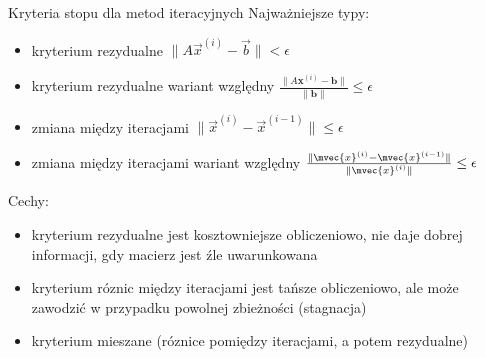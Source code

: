 \begin{frame}{Kryteria stopu dla metod iteracyjnych}
Najważniejsze typy:
\begin{itemize}
    \item kryterium rezydualne $\|A \vec{x}^{(i)} - \vec{b}\| < \epsilon$ 
    \item kryterium rezydualne wariant względny $\frac{\|A\mathbf{x}^{(i)} - \mathbf{b}\|}{\|\mathbf{b}\|} \leq \epsilon$  
    \item zmiana między iteracjami $\|\vec{x}^{(i)} - \vec{x}^{(i-1)}\|\leq \epsilon$  
    \item zmiana między iteracjami wariant względny 
    $\frac{\|\mvec{x}^{(i)} - \mvec{x}^{(i-1)}\|}{\|\mvec{x}^{(i)}\|} \leq \epsilon$  
\end{itemize}
Cechy:
\begin{itemize}
\item kryterium rezydualne jest kosztowniejsze obliczeniowo, nie daje dobrej informacji, gdy macierz jest źle uwarunkowana
\item kryterium róznic między iteracjami jest tańsze obliczeniowo, ale  może zawodzić w przypadku powolnej zbieżności (stagnacja)
\item kryterium mieszane (róznice pomiędzy iteracjami, a potem rezydualne)
\end{itemize}
\end{frame}



